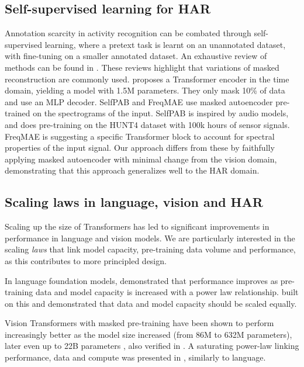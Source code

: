 \subsection{Self-supervised learning for HAR}

Annotation scarcity in activity recognition can be combated through self-supervised learning, where a pretext task is learnt on an unannotated dataset, with fine-tuning on a smaller annotated dataset.
An exhaustive review of methods can be found in \cite{assessingSSLHAR22,SSLHARsurvey}.
These reviews highlight that variations of masked reconstruction are commonly used.
\cite{HARmaskedreconstruction} proposes a Transformer encoder in the time domain, yielding a model with 1.5M parameters. They only mask 10\% of data and use an MLP decoder. 
SelfPAB \cite{selfpab} \cite{monoselfpab} and FreqMAE \cite{freqmae} use masked autoencoder pre-trained on the spectrograms of the input. 
SelfPAB is inspired by audio models, and does pre-training on the HUNT4 dataset with 100k hours of sensor signals.
FreqMAE is suggesting a specific Transformer block to account for spectral properties of the input signal. Our approach differs from these by faithfully applying masked autoencoder \cite{maskedautoencoder} with minimal change from the vision domain, demonstrating that this approach generalizes well to the HAR domain.


\subsection{Scaling laws in language, vision and HAR}

Scaling up the size of Transformers has led to significant improvements in performance in language and vision models.
We are particularly interested in the scaling {\em laws} that link model capacity, pre-training data volume and performance, as this contributes to more principled design.

In language foundation models, \cite{kaplan2020scalinglawsneurallanguage} demonstrated that performance improves as pre-training data and model capacity is increased with a power law relationship. \cite{hoffmann2022chinchilla} built on this and demonstrated that data and model capacity should be scaled equally.

Vision Transformers with masked pre-training \cite{vit} have been shown to perform increasingly better as the model size increased (from 86M to 632M parameters), later even up to 22B parameters \cite{Dehghani23a}, also verified in \cite{maskedautoencoder}.
A saturating power-law linking performance, data and compute was presented in \cite{zhai2022scalingvits}, similarly to language.

